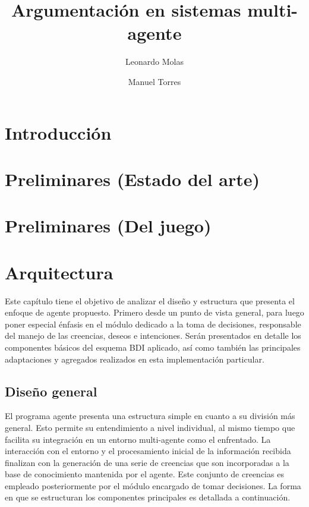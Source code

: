 \documentclass[oneside]{book}
\title{Argumentación en sistemas multi-agente} %
\author{Leonardo Molas \and Manuel Torres}
\begin{document}
\maketitle
\tableofcontents

\chapter*{Introducción}



\chapter{Preliminares (Estado del arte)} %


\chapter{Preliminares (Del juego)}


\chapter{Arquitectura} %

Este capítulo tiene el objetivo de analizar el diseño y estructura que presenta el 
enfoque de agente propuesto. Primero desde un punto de vista general, para luego 
poner especial énfasis en el módulo dedicado a la toma de decisiones, responsable 
del manejo de las creencias, deseos e intenciones. Serán presentados en detalle los 
componentes básicos del esquema BDI aplicado, así como también las principales 
adaptaciones y agregados realizados en esta implementación particular.

\section{Diseño general}


El programa agente presenta una estructura simple en cuanto a su división más general. 
Esto permite su entendimiento a nivel individual, al mismo tiempo que facilita su 
integración en un entorno multi-agente como el enfrentado. La interacción con el entorno 
y el procesamiento inicial de la información recibida finalizan con la generación de una 
serie de creencias que son incorporadas a la base de conocimiento mantenida por el agente. 
Este conjunto de creencias es empleado posteriormente por el módulo encargado de tomar 
decisiones. La forma en que se estructuran los componentes principales es detallada a 
continuación.
\end{document}
